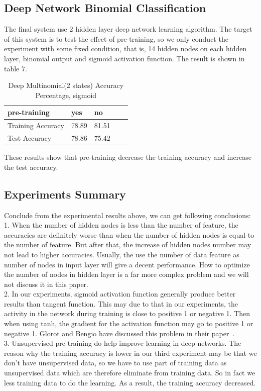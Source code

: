 \documentclass[11pt,letterpaper]{article}
\begin{document}
\subsection{Deep Network Binomial Classification}
The final system use 2 hidden layer deep network learning algorithm. The target of this system is to test the effect of pre-training, so we only conduct the experiment with some fixed condition, that is, 14 hidden nodes on each hidden layer, binomial output and sigmoid activation function. The result is shown in table 7.
\begin{table}
\begin{center}
\begin{tabular}{|l|l|l|l|l|}
\hline \bf pre-training  & \bf yes & \bf no \\ \hline
Training Accuracy& 78.89 & 81.51 \\
Test Accuracy & 78.86 & 75.42 \\
\hline
\end{tabular}
\end{center}
\caption{\label{deep2-sig} Deep Multinomial(2 states) Accuracy Percentage, sigmoid}
\end{table}

These results show that pre-training decrease the training accuracy and increase the test accuracy.

\subsection{Experiments Summary}
Conclude from the experimental results above, we can get following conclusions: \\
1. When the number of hidden nodes is less than the number of feature, the accuracies are definitely worse than when the number of hidden nodes is equal to the number of feature. But after that, the increase of hidden nodes number may not lead to higher accuracies. Usually, the use the number of data feature as number of nodes in input layer will give a decent performance. How to optimize the number of nodes in hidden layer is a far more complex problem and we will not discuss it in this paper.
\\
2. In our experiments, sigmoid activation function generally produce better results than tangent function. This may due to that in our experiments, the activity in the network during training is close to positive 1 or negative 1. Then when using tanh, the gradient for the activation function may go to positive 1 or negative 1. Glorot and Bengio have discussed this problem in their paper~\cite{GL:10}.
\\
3. Unsupervised pre-training do help improve learning in deep networks. The reason why the training accuracy is lower in our third experiment may be that we don't have unsupervised data, so we have to use part of training data as unsupervised data which are therefore eliminate from training data. So in fact we less training data to do the learning. As a result, the training accuracy decreased.
\end{document}
